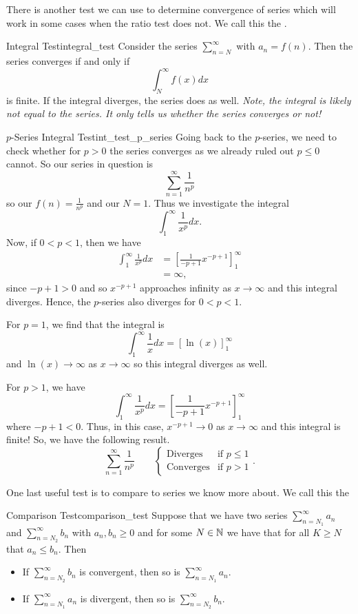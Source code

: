 There is another test we can use to determine convergence of series which will work in some cases when the ratio test does not. We call this the .

\begin{prop}{Integral Test}{integral_test}
Consider the series $\sum_{n=N}^\infty$ with $a_n=f(n)$.  Then the series converges if and only if
\[
\int_{N}^\infty f(x)dx
\]
is finite. If the integral diverges, the series does as well. \emph{Note, the integral is likely not equal to the series. It only tells us whether the series converges or not!}
\end{prop}

\begin{ex}{$p$-Series Integral Test}{int_test_p_series}
Going back to the $p$-series, we need to check whether for $p>0$ the series converges as we already ruled out $p\leq 0$ cannot.  So our series in question is
\[
\sum_{n=1}^\infty \frac{1}{n^p}
\]
so our $f(n)=\frac{1}{n^p}$ and our $N=1$.  Thus we investigate the integral
\[
\int_1^\infty \frac{1}{x^p}dx.
\]
Now, if $0<p<1$, then we have
\begin{align*}
    \int_1^\infty \frac{1}{x^p}dx &= \left[\frac{1}{-p+1} x^{-p+1} \right]_1^\infty\\
    &= \infty,
\end{align*}
since $-p+1>0$ and so $x^{-p+1}$ approaches infinity as $x\to \infty$ and this integral diverges.  Hence, the $p$-series also diverges for $0<p<1$. 

For $p=1$, we find that the integral is
\[
\int_1^\infty \frac{1}{x} dx = \left[ \ln(x) \right]_1^\infty
\]
and $\ln(x)\to \infty$ as $x\to \infty$ so this integral diverges as well.  

For $p>1$, we have
\[
\int_1^\infty \frac{1}{x^p}dx = \left[ \frac{1}{-p+1}x^{-p+1}\right]_1^\infty
\]
where $-p+1<0$. Thus, in this case, $x^{-p+1}\to 0$ as $x\to \infty$ and this integral is finite!  So, we have the following result.
\[
\sum_{n=1}^\infty \frac{1}{n^p} \qquad \begin{cases} \textrm{Diverges} & \textrm{if $p\leq 1$} \\
\textrm{Converges} & \textrm{if $p>1$}\end{cases}.
\]
\end{ex}

One last useful test is to compare to series we know more about. We call this the 

\begin{prop}{Comparison Test}{comparison_test}
Suppose that we have two series $\sum_{n=N_1}^\infty a_n$ and $\sum_{n=N_2}^\infty b_n$ with $a_n,b_n\geq 0$ and for some $N \in \mathbb{N}$ we have that for all $K\geq N$ that $a_n\leq b_n$. Then
\begin{itemize}
    \item If $\sum_{n=N_2}^\infty b_n$ is convergent, then so is $\sum_{n=N_1}^\infty a_n$.
    \item If $\sum_{n=N_1}^\infty a_n$ is divergent, then so is $\sum_{n=N_2}^\infty b_n$.
\end{itemize}
\end{prop}
